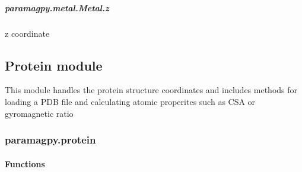 \documentclass[a4paper,10pt,english,openany,oneside]{sphinxmanual}
\begin{document}
\begin{fulllineitems}
\begin{fulllineitems}
\begin{fulllineitems}
\end{fulllineitems}



\subparagraph{paramagpy.metal.Metal.z}
\label{\detokenize{reference/generated/paramagpy.metal.Metal.z:paramagpy-metal-metal-z}}\label{\detokenize{reference/generated/paramagpy.metal.Metal.z::doc}}

\begin{fulllineitems}
\label{\detokenize{reference/generated/paramagpy.metal.Metal.z:paramagpy.metal.Metal.z}}
z coordinate

\end{fulllineitems}


\end{fulllineitems}


\end{fulllineitems}



\subsection{Protein module}
\label{\detokenize{reference/index:protein-module}}
This module handles the protein structure coordinates and includes methods for
loading a PDB file and calculating atomic properites such as CSA or gyromagnetic ratio


\subsubsection{paramagpy.protein}
\label{\detokenize{reference/protein:module-paramagpy.protein}}\label{\detokenize{reference/protein:paramagpy-protein}}\label{\detokenize{reference/protein:protein}}\label{\detokenize{reference/protein::doc}}

\paragraph{Functions}
\label{\detokenize{reference/protein:functions}}
\end{document}
